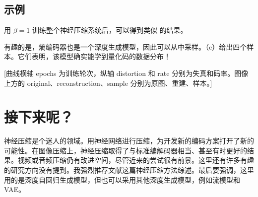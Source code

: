 \subsection{示例}

用 $\beta=1$ 训练整个神经压缩系统后，可以得到类似 的结果。

有趣的是，熵编码器也是一个深度生成模型，因此可以从中采样。（c）给出四个样本。它们表明，该模型确实能学到量化码的数据分布！

[曲线横轴 epochs 为训练轮次，纵轴 distortion 和 rate 分别为失真和码率。图像上方的 original、reconstruction、sample 分别为原图、重建、样本。]

\section{接下来呢？}
\label{sec:10-05}

神经压缩是个迷人的领域。用神经网络进行压缩，为开发新的编码方案打开了新的可能性。在图像压缩上，神经压缩取得了与标准编解码器相当、甚至有时更好的结果。视频或音频压缩仍有改进空间，尽管近来的尝试很有前景。这里还有许多有趣的研究方向没有提到。我强烈推荐文献这篇神经压缩方法综述。最后要强调，这里用的是深度自回归生成模型，但也可以采用其他深度生成模型，例如流模型和 VAE。

\FloatBarrier


